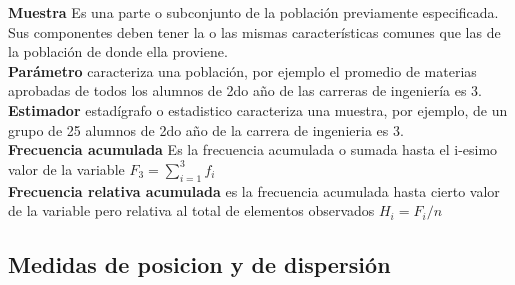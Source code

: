 \documentclass[10pt,a4paper]{article}
\begin{document}
	\textbf{Muestra} Es una parte o subconjunto de la población previamente especificada. Sus componentes deben tener la o las mismas características comunes que las de la población de donde ella proviene.\\
	
	\textbf{Parámetro} caracteriza una población, por ejemplo el promedio de materias aprobadas de todos los alumnos de 2do año de las carreras de ingeniería es 3.\\
	
	\textbf{Estimador} estadígrafo o estadistico caracteriza una muestra, por ejemplo, de un grupo de 25 alumnos de 2do año de la carrera de ingenieria es 3.\\
	
	\textbf{Frecuencia acumulada} Es la frecuencia acumulada o sumada hasta el i-esimo valor de la variable $F_3=\sum_{i=1}^{3}f_i$\\
	
	\textbf{Frecuencia relativa acumulada} es la frecuencia acumulada hasta cierto valor de la variable pero relativa al total de elementos observados $H_i=F_i/n$
	
	\subsection{Medidas de posicion y de dispersión}
	
\end{document}
